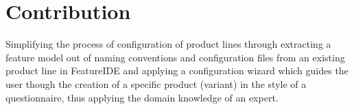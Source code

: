 \section*{Contribution}

Simplifying the process of configuration of product lines through extracting a feature model out of naming conventions and configuration files from an existing product line in FeatureIDE and applying a configuration wizard which guides the user though the creation of a specific product (variant) in the style of a questionnaire, thus applying the domain knowledge of an expert.

